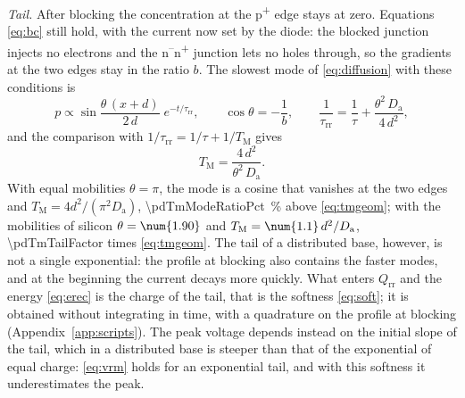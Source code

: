 \documentclass[10pt,a4paper]{scrartcl}
\newcommand{\Qrr}{Q_\mathrm{rr}}
\newcommand{\taurr}{\tau_\mathrm{rr}}
\newcommand{\TM}{T_\mathrm{M}}
\newcommand{\Da}{D_\mathrm{a}}
\newcommand{\Pp}{p\textsuperscript{+}}
\newcommand{\Nm}{n\textsuperscript{--}}
\newcommand{\Np}{n\textsuperscript{+}}
\begin{document}
\emph{Tail.} After blocking the concentration at the \Pp{} edge stays at zero. Equations \eqref{eq:bc} still hold, with the current now set by the diode: the blocked junction injects no electrons and the \Nm\Np{} junction lets no holes through, so the gradients at the two edges stay in the ratio $b$. The slowest mode of \eqref{eq:diffusion} with these conditions is
\begin{equation}
p \propto \sin\frac{\theta\,(x+d)}{2\,d}\;e^{-t/\taurr} , \qquad \cos\theta = -\frac1b , \qquad \frac{1}{\taurr} = \frac1\tau + \frac{\theta^2\,\Da}{4\,d^2} ,
\end{equation}
and the comparison with $1/\taurr = 1/\tau + 1/\TM$ gives
\begin{equation}
\TM = \frac{4\,d^2}{\theta^2\,\Da} .
\label{eq:tmtail}
\end{equation}
With equal mobilities $\theta = \pi$, the mode is a cosine that vanishes at the two edges and $\TM = 4d^2/(\pi^2\Da)$, \SI{\pdTmModeRatioPct}{\percent} above \eqref{eq:tmgeom}; with the mobilities of silicon $\theta = \num{\pdTmTailAngle}$ and $\TM = \num{\pdTmTailCoef}\,d^2/\Da$, \num{\pdTmTailFactor} times \eqref{eq:tmgeom}. The tail of a distributed base, however, is not a single exponential: the profile at blocking also contains the faster modes, and at the beginning the current decays more quickly. What enters $\Qrr$ and the energy \eqref{eq:erec} is the charge of the tail, that is the softness \eqref{eq:soft}; it is obtained without integrating in time, with a quadrature on the profile at blocking (Appendix~\ref{app:scripts}). The peak voltage depends instead on the initial slope of the tail, which in a distributed base is steeper than that of the exponential of equal charge: \eqref{eq:vrm} holds for an exponential tail, and with this softness it underestimates the peak.
\end{document}
